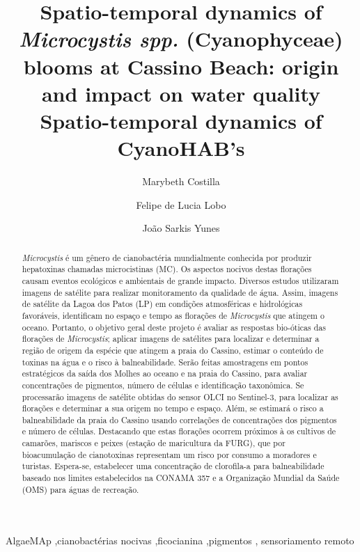 \documentclass[
  super,
  preprint,
  3p]{elsarticle}
\begin{document}
\begin{frontmatter}
\title{Spatio-temporal dynamics of \emph{Microcystis spp.}
(Cyanophyceae) blooms at Cassino Beach: origin and impact on water
quality \\\large{Spatio-temporal dynamics of CyanoHAB's} }
\author[1]{Marybeth Costilla%
%
}
\author[2]{Felipe de Lucia Lobo%
%
}
\author[1]{João Sarkis Yunes%
%
}





        
\begin{abstract}
\emph{Microcystis} é um gênero de cianobactéria mundialmente conhecida
por produzir hepatoxinas chamadas microcistinas (MC). Os aspectos
nocivos destas florações causam eventos ecológicos e ambientais de
grande impacto. Diversos estudos utilizaram imagens de satélite para
realizar monitoramento da qualidade de água. Assim, imagens de satélite
da Lagoa dos Patos (LP) em condições atmosféricas e hidrológicas
favoráveis, identificam no espaço e tempo as florações de
\emph{Microcystis} que atingem o oceano. Portanto, o objetivo geral
deste projeto é avaliar as respostas bio-óticas das florações de
\emph{Microcystis}; aplicar imagens de satélites para localizar e
determinar a região de origem da espécie que atingem a praia do Cassino,
estimar o conteúdo de toxinas na água e o risco à balneabilidade. Serão
feitas amostragens em pontos estratégicos da saída dos Molhes ao oceano
e na praia do Cassino, para avaliar concentrações de pigmentos, número
de células e identificação taxonômica. Se processarão imagens de
satélite obtidas do sensor OLCI no Sentinel-3, para localizar as
florações e determinar a sua origem no tempo e espaço. Além, se estimará
o risco a balneabilidade da praia do Cassino usando correlações de
concentrações dos pigmentos e número de células. Destacando que estas
florações ocorrem próximos à os cultivos de camarões, mariscos e peixes
(estação de maricultura da FURG), que por bioacumulação de cianotoxinas
representam um risco por consumo a moradores e turistas. Espera-se,
estabelecer uma concentração de clorofila-a para balneabilidade baseado
nos limites estabelecidos na CONAMA 357 e a Organização Mundial da Saúde
(OMS) para águas de recreação.
\end{abstract}





\begin{keyword}
    AlgaeMAp \sep cianobactérias
nocivas \sep ficocianina \sep pigmentos \sep 
    sensoriamento remoto
\end{keyword}
\end{frontmatter}
\end{document}

